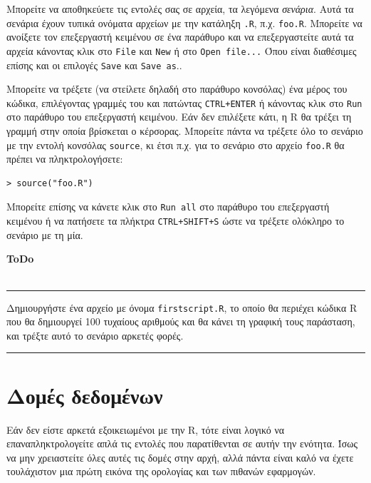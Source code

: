 \documentclass[a4paper,10pt,twocolumn]{article}
\makeatletter
\newenvironment{ToDo} {
  \begin{flushright}
    \hfill
    \begin{minipage}{0.9\columnwidth}
    \textsf{\textbf{ToDo}} \\
      \vspace{-0.7cm}\\
      {\color{Gray}\rule[-0.05cm]{\columnwidth}{1.5pt}}} {
      {\color{Gray}\rule[0.3cm]{\columnwidth}{1.5pt}}
    \end{minipage}
    \vspace{0.3cm}
  \end{flushright}
  }
\let\SF@@footnote\footnote
\def\footnote{\ifx\protect\@typeset@protect
 \expandafter\SF@@footnote
 \else
 \expandafter\SF@gobble@opt
 \fi
}
\edef\SF@gobble@opt{\noexpand\protect
 \expandafter\noexpand\csname SF@gobble@opt \endcsname}
\makeatother
\begin{document}
Μπορείτε να αποθηκεύετε τις εντολές σας σε αρχεία, τα λεγόμενα \emph{σενάρια}. Αυτά τα σενάρια έχουν τυπικά
ονόματα αρχείων με την κατάληξη \texttt{.R}, π.χ. \texttt{foo.R}. Μπορείτε να ανοίξετε τον επεξεργαστή κειμένου
σε ένα παράθυρο και να επεξεργαστείτε αυτά τα αρχεία κάνοντας κλικ στο \texttt{File} και \texttt{New} ή στο 
\texttt{Open file...}\footnote{Όπου είναι διαθέσιμες επίσης και οι επιλογές \texttt{Save} και
\texttt{Save as}.}.

Μπορείτε να τρέξετε (να στείλετε δηλαδή στο παράθυρο κονσόλας) ένα μέρος του κώδικα, επιλέγοντας γραμμές του και
πατώντας \texttt{CTRL+ENTER} ή κάνοντας κλικ στο \texttt{Run} στο παράθυρο του επεξεργαστή κειμένου. Εάν δεν
επιλέξετε κάτι, η R θα τρέξει τη γραμμή στην οποία βρίσκεται ο κέρσορας. Μπορείτε πάντα να τρέξετε όλο το
σενάριο με την εντολή κονσόλας \texttt{source}, κι έτσι π.χ. για το σενάριο στο αρχείο \texttt{foo.R} θα πρέπει
να πληκτρολογήσετε:

\begin{Verbatim}[frame=single,gobble=0]
> source("foo.R")
\end{Verbatim}

Μπορείτε επίσης να κάνετε κλικ στο \texttt{Run all} στο παράθυρο του επεξεργαστή κειμένου ή να
πατήσετε τα πλήκτρα \texttt{CTRL+SHIFT+S} ώστε να τρέξετε ολόκληρο το σενάριο με τη μία.

\begin{ToDo}
Δημιουργήστε ένα αρχείο με όνομα \texttt{firstscript.R}, το οποίο θα περιέχει κώδικα R που θα δημιουργεί 100
τυχαίους αριθμούς και θα κάνει τη γραφική τους παράσταση, και τρέξτε αυτό το σενάριο αρκετές φορές.\\
\end{ToDo}


\section{Δομές δεδομένων} 
\label{sec:structures}

Εάν δεν είστε αρκετά εξοικειωμένοι με την R, τότε είναι λογικό να επαναπληκτρολογείτε απλά τις εντολές που 
παρατίθενται σε αυτήν την ενότητα. Ίσως να μην χρειαστείτε όλες αυτές τις δομές στην αρχή, αλλά πάντα
είναι καλό να έχετε τουλάχιστον μια πρώτη εικόνα της ορολογίας και των πιθανών εφαρμογών.
\end{document}
